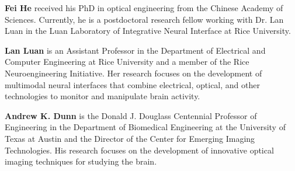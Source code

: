 \documentclass[12pt]{spieman}
\begin{document}
\begin{spacing}{2}
\vspace{2ex}\noindent\textbf{Fei He} received his PhD in optical engineering from the Chinese Academy of Sciences. Currently, he is a postdoctoral research fellow working with Dr. Lan Luan in the Luan Laboratory of Integrative Neural Interface at Rice University.

\vspace{2ex}\noindent\textbf{Lan Luan} is an Assistant Professor in the Department of Electrical and Computer Engineering at Rice University and a member of the Rice Neuroengineering Initiative. Her research focuses on the development of multimodal neural interfaces that combine electrical, optical, and other technologies to monitor and manipulate brain activity.

\vspace{2ex}\noindent\textbf{Andrew K. Dunn} is the Donald J. Douglass Centennial Professor of Engineering in the Department of Biomedical Engineering at the University of Texas at Austin and the Director of the Center for Emerging Imaging Technologies. His research focuses on the development of innovative optical imaging techniques for studying the brain.


\listoffigures

\end{spacing}
\end{document}
